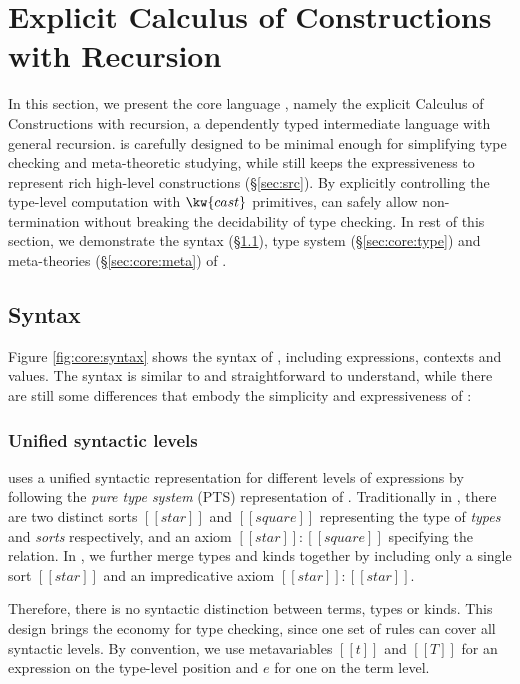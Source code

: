 \section{Explicit Calculus of Constructions with Recursion}\label{sec:core}

In this section, we present the core language \name, namely the explicit Calculus of Constructions with recursion, a dependently typed intermediate language with general recursion. \name is carefully designed to be minimal enough for simplifying type checking and meta-theoretic studying, while still keeps the expressiveness to represent rich high-level constructions (\S \ref{sec:src}). By explicitly controlling the type-level computation with $\kw{cast}$ primitives, \name can safely allow non-termination without breaking the decidability of type checking. In rest of this section, we demonstrate the syntax (\S \ref{sec:core:syn}), type system (\S \ref{sec:core:type}) and meta-theories (\S \ref{sec:core:meta}) of \name.

\subsection{Syntax}\label{sec:core:syn}
Figure \ref{fig:core:syntax} shows the syntax of \name, including expressions, contexts and values. The syntax is similar to \cc and straightforward to understand, while there are still some differences that embody the simplicity and expressiveness of \name:

\subsubsection{Unified syntactic levels}
\name uses a unified syntactic representation for different levels of expressions by following the \emph{pure type system} (PTS) representation of \cc. Traditionally in \cc, there are two distinct sorts $[[star]]$ and $[[square]]$ representing the type of \emph{types} and \emph{sorts} respectively, and an axiom $[[star]]:[[square]]$ specifying the relation. In \name, we further merge types and kinds together by including only a single sort $[[star]]$ and an impredicative axiom $[[star]]:[[star]]$. 

Therefore, there is no syntactic distinction between terms, types or kinds. This design brings the economy for type checking, since one set of rules can cover all syntactic levels. By convention, we use metavariables $[[t]]$ and $[[T]]$ for an expression on the type-level position and $e$ for one on the term level.

